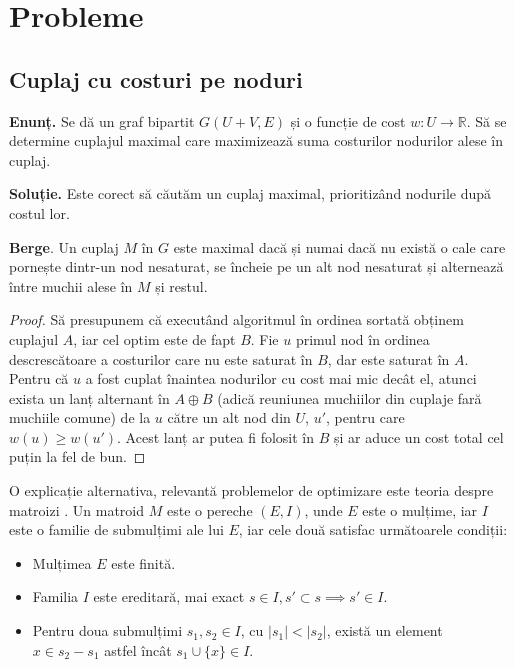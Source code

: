 \chapter{Probleme}

\section{Cuplaj cu costuri pe noduri}

\noindent \textbf{Enunț.} Se dă un graf bipartit $G(U + V, E)$ și o funcție de cost $w \colon U \to \mathbb{R}$. Să se determine cuplajul
maximal care maximizează suma costurilor nodurilor alese în cuplaj.

\noindent \textbf{Soluție.} Este corect să căutăm un cuplaj maximal,
prioritizând nodurile după costul lor.

\begin{lem}
  \textbf{Berge}. Un cuplaj $M$ în $G$ este maximal dacă și numai dacă nu există o cale care pornește dintr-un nod nesaturat, se încheie pe un alt
  nod nesaturat și alternează între muchii alese în $M$ și restul.
\end{lem}

\begin{proof}
  Să presupunem că executând algoritmul în ordinea sortată obținem cuplajul $A$, iar cel optim este de fapt $B$.
  Fie $u$ primul nod în ordinea descrescătoare a costurilor care nu este saturat în $B$, dar este saturat în $A$.
  Pentru că $u$ a fost cuplat înaintea nodurilor cu cost mai mic decât el, atunci exista un lanț alternant în
  $A \oplus B$ (adică reuniunea muchiilor din cuplaje fară muchiile comune) de la $u$ către un alt nod din $U$, $u'$,
  pentru care $w(u) \geq w(u')$. Acest lanț ar putea fi folosit în $B$ și ar aduce un cost total cel puțin la fel de bun.
\end{proof}

O explicație alternativa, relevantă problemelor de optimizare este teoria despre matroizi \cite{matroid}. Un matroid $M$ este o pereche
$(E, I)$, unde $E$ este o mulțime, iar $I$ este o familie de submulțimi ale lui $E$, iar cele două satisfac următoarele condiții:

\begin{itemize}
  \item Mulțimea $E$ este finită.
  \item Familia $I$ este ereditară, mai exact $s \in I, s' \subset s \implies s' \in I$.
  \item Pentru doua submulțimi $s_{1}, s_{2} \in I$, cu $|s_{1}| < |s_{2}|$, există un element
    $x \in s_{2} - s_{1}$ astfel încât $s_{1} \cup \{x\} \in I$.
\end{itemize}


